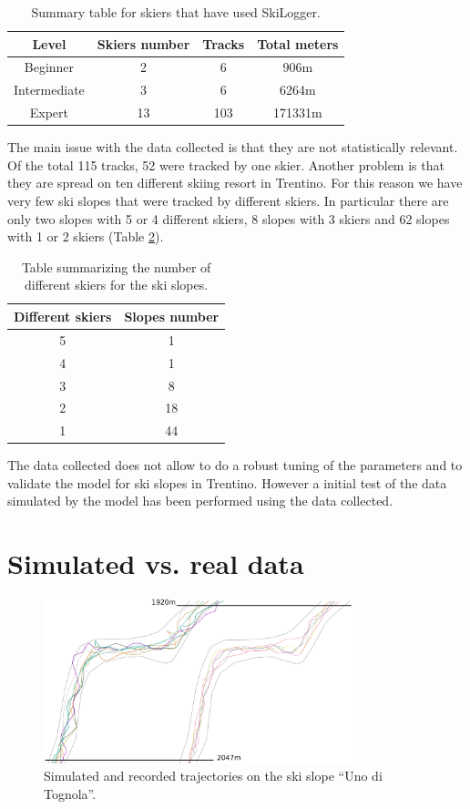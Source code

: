 \documentclass[12pt,a4paper,twoside]{book}
\begin{document}
\begin{table}[!h]
  \centering
  \begin{tabular}{ | c | c | c | c | }
    \hline
    Level & Skiers number & Tracks & Total meters \\
    \hline
    Beginner & 2  & 6 & 906m \\
    Intermediate & 3 & 6 & 6264m \\
    Expert & 13 & 103 & 171331m \\
    \hline
  \end{tabular}
  \caption{Summary table for skiers that have used SkiLogger.}
  \label{skiers}
\end{table}

The main issue with the data collected is that they are not statistically relevant. Of the total 115 tracks, 52 were tracked by one skier. Another problem is that they are spread on ten different skiing resort in Trentino. For this reason we have very few ski slopes that were tracked by different skiers. In particular there are only two slopes with 5 or 4 different skiers, 8 slopes with 3 skiers and 62 slopes with 1 or 2 skiers (Table \ref{slopes}).

\begin{table}[!h]
  \centering
  \begin{tabular}{ | c | c | }
    \hline
    Different skiers & Slopes number \\
    \hline
    5 & 1 \\
    4 & 1 \\
    3 & 8 \\
    2 & 18 \\
    1 & 44 \\
    \hline
  \end{tabular}
  \caption{Table summarizing the number of different skiers for the ski slopes.}
  \label{slopes}
\end{table}

The data collected does not allow to do a robust tuning of the parameters and to validate the model for ski slopes in Trentino. However a initial test of the data simulated by the model has been performed using the data collected.

\section{Simulated vs. real data}
\begin{figure}[!h]
  \centering
    \includegraphics[width=0.8\textwidth]{images/traiettorie.eps}
    \caption{Simulated and recorded trajectories on the ski slope ``Uno di Tognola''.}\label{traj}
\end{figure}
\end{document}
